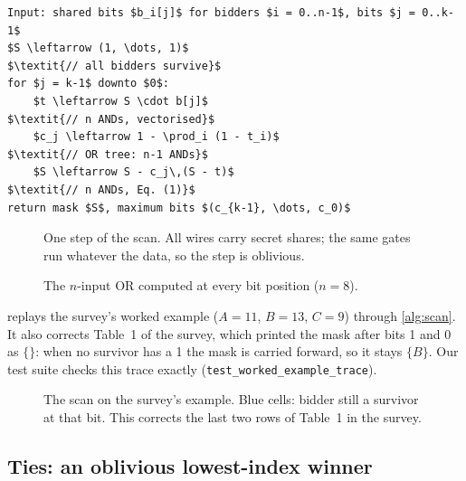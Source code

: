 \documentclass[11pt,a4paper]{article}
\newcommand{\code}[1]{\texttt{#1}}
\begin{document}
\begin{algo}[t]
\begin{lstlisting}
Input: shared bits $b_i[j]$ for bidders $i = 0..n-1$, bits $j = 0..k-1$
$S \leftarrow (1, \dots, 1)$                                  $\textit{// all bidders survive}$
for $j = k-1$ downto $0$:
    $t \leftarrow S \cdot b[j]$                                 $\textit{// n ANDs, vectorised}$
    $c_j \leftarrow 1 - \prod_i (1 - t_i)$                        $\textit{// OR tree: n-1 ANDs}$
    $S \leftarrow S - c_j\,(S - t)$                             $\textit{// n ANDs, Eq. (1)}$
return mask $S$, maximum bits $(c_{k-1}, \dots, c_0)$
\end{lstlisting}
\caption{Oblivious bit-slice scan (\code{bitslice\_scan} in \code{mpc/auction.mpc}). No step
depends on a secret value, so the compiled circuit is fixed by $n$, $k$ and the mechanism.}
\label{alg:scan}
\end{algo}

\begin{figure}[t]
  \centering
  \resizebox{\linewidth}{!}{}
  \caption{One step of the scan. All wires carry secret shares; the same gates run whatever the
           data, so the step is oblivious.}
  \label{fig:bitcircuit}
\end{figure}

\begin{figure}[t]
  \centering
  \resizebox{0.78\linewidth}{!}{}
  \caption{The $n$-input OR computed at every bit position ($n=8$).}
  \label{fig:ortree}
\end{figure}

 replays the survey's worked example ($A = 11$, $B = 13$, $C = 9$) through
\cref{alg:scan}. It also corrects Table~1 of the survey, which printed the mask after bits 1 and 0
as $\{\}$: when no survivor has a 1 the mask is carried forward, so it stays $\{B\}$. Our test
suite checks this trace exactly (\code{test\_worked\_example\_trace}).

\begin{figure}[H]
  \centering
  \resizebox{0.85\linewidth}{!}{}
  \caption{The scan on the survey's example. Blue cells: bidder still a survivor at that bit.
           This corrects the last two rows of Table~1 in the survey.}
  \label{fig:worked}
\end{figure}

\subsection{Ties: an oblivious lowest-index winner}
\end{document}
